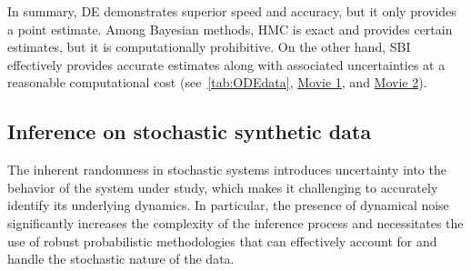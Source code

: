 \documentclass[preprint,11pt,authoryear]{elsarticle}
\begin{document}
In summary, DE demonstrates superior speed and accuracy, but it only provides a point estimate. Among Bayesian methods, HMC is exact and provides certain estimates, but it is computationally prohibitive. On the other hand, SBI effectively provides accurate estimates along with associated uncertainties at a reasonable computational cost (see~\autoref{tab:ODEdata},  \href{run:./Videos/Movie1_MPR_ODE_HMC_RV.mp4}{Movie 1}, and  \href{run:./Videos/Movie2_MPR_ODE_SBI_RV.mp4}{Movie 2}). 



\subsection{Inference on stochastic synthetic data}

The inherent randomness in stochastic systems introduces uncertainty into the behavior of the system under study, which makes it challenging to accurately identify its underlying dynamics. In particular, the presence of dynamical noise significantly increases the complexity of the inference process and necessitates the use of robust probabilistic methodologies that can effectively account for and handle the stochastic nature of the data. 
\end{document}
